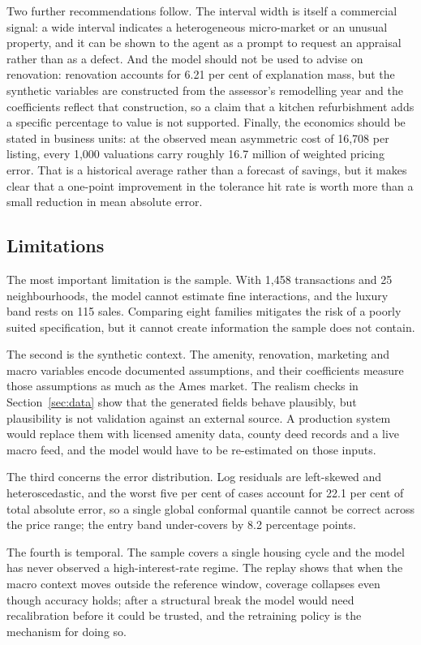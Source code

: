 Two further recommendations follow. The interval width is itself a commercial signal:
a wide interval indicates a heterogeneous micro-market or an unusual property, and it
can be shown to the agent as a prompt to request an appraisal rather than as a defect.
And the model should not be used to advise on renovation: renovation accounts for
6.21 per cent of explanation mass, but the synthetic variables are constructed from
the assessor's remodelling year and the coefficients reflect that construction, so a
claim that a kitchen refurbishment adds a specific percentage to value is not
supported. Finally, the economics should be stated in business units: at the observed
mean asymmetric cost of 16,708 \USD{} per listing, every 1,000 valuations carry
roughly 16.7 million \USD{} of weighted pricing error. That is a historical average
rather than a forecast of savings, but it makes clear that a one-point improvement in
the tolerance hit rate is worth more than a small reduction in mean absolute error.

\subsection{Limitations}

The most important limitation is the sample. With 1,458 transactions and 25
neighbourhoods, the model cannot estimate fine interactions, and the luxury band rests
on 115 sales. Comparing eight families mitigates the risk of a poorly suited
specification, but it cannot create information the sample does not contain.

The second is the synthetic context. The amenity, renovation, marketing and macro
variables encode documented assumptions, and their coefficients measure those
assumptions as much as the Ames market. The realism checks in Section~\ref{sec:data}
show that the generated fields behave plausibly, but plausibility is not validation
against an external source. A production system would replace them with licensed
amenity data, county deed records and a live macro feed, and the model would have to be
re-estimated on those inputs.

The third concerns the error distribution. Log residuals are left-skewed and
heteroscedastic, and the worst five per cent of cases account for 22.1 per cent of
total absolute error, so a single global conformal quantile cannot be correct across
the price range; the entry band under-covers by 8.2 percentage points.

The fourth is temporal. The sample covers a single housing cycle and the model has
never observed a high-interest-rate regime. The replay shows that when the macro
context moves outside the reference window, coverage collapses even though accuracy
holds; after a structural break the model would need recalibration before it could be
trusted, and the retraining policy is the mechanism for doing so.

